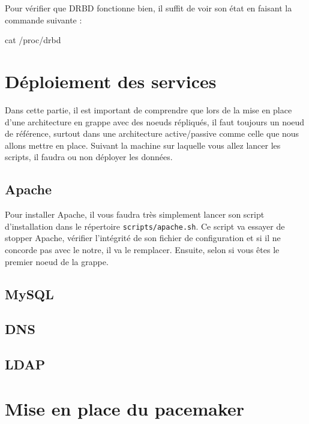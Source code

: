 \documentclass[11pt,a4paper]{report}
\begin{document}
                Pour vérifier que DRBD fonctionne bien, il suffit de voir son état en faisant la commande suivante :\\
                
                \begin{bashcode}
                    cat /proc/drbd
                \end{bashcode}
                
        \section{Déploiement des services}
            
            Dans cette partie, il est important de comprendre que lors de la mise en place d'une architecture en grappe avec des noeuds répliqués, il faut toujours un noeud de référence, surtout dans une architecture active/passive comme celle que nous allons mettre en place.
            Suivant la machine sur laquelle vous allez lancer les scripts, il faudra ou non déployer les données.
        
            \subsection{Apache}
                
                Pour installer Apache, il vous faudra très simplement lancer son script d'installation dans le répertoire \verb+scripts/apache.sh+.
                Ce script va essayer de stopper Apache, vérifier l'intégrité de son fichier de configuration et si il ne concorde pas avec le notre, il va le remplacer. Ensuite, selon si vous êtes le premier noeud de la grappe.
                
            \subsection{MySQL}
            \subsection{DNS}
            \subsection{LDAP}
        \section{Mise en place du pacemaker}
            
\end{document}
